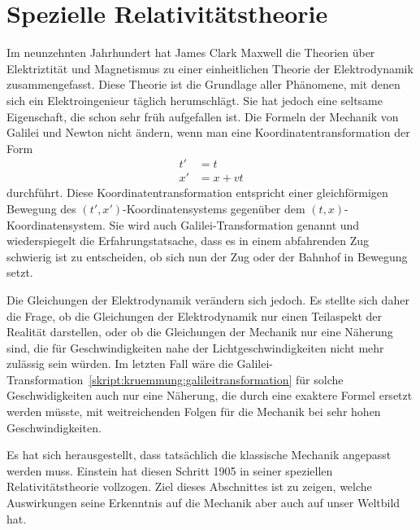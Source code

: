 %
%
%

\chapter{Spezielle Relativitätstheorie%
\label{skript:chapter:spezielle}}
\rhead{}
Im neunzehnten Jahrhundert hat James Clark Maxwell die Theorien
über Elektriztität und Magnetismus zu einer einheitlichen Theorie
der Elektrodynamik zusammengefasst.
Diese Theorie ist die Grundlage aller Phänomene, mit denen sich
ein Elektroingenieur täglich herumschlägt.
Sie hat jedoch eine seltsame Eigenschaft, die schon sehr früh
aufgefallen ist.
Die Formeln der Mechanik von Galilei und Newton nicht ändern,
wenn man eine Koordinatentransformation der Form
\begin{equation}
\begin{aligned}
t'&=t\\
x'&=x+vt
\end{aligned}
\label{skript:kruemmung:galileitransformation}
\end{equation}
durchführt.
Diese Koordinatentransformation entspricht einer gleichförmigen
Bewegung des $(t',x')$-Koordinatensystems gegenüber dem 
$(t,x)$-Koordinatensystem.
Sie wird auch Galilei-Transformation genannt und wiederspiegelt die
Erfahrungstatsache, dass es in einem abfahrenden Zug schwierig ist
zu entscheiden, ob sich nun der Zug oder der Bahnhof in Bewegung setzt.

Die Gleichungen der Elektrodynamik verändern sich jedoch.
Es stellte sich daher die Frage, ob die Gleichungen der Elektrodynamik
nur einen Teilaspekt der Realität darstellen, oder ob die Gleichungen
der Mechanik nur eine Näherung sind, die für Geschwindigkeiten nahe
der Lichtgeschwindigkeiten nicht mehr zulässig sein würden.
Im letzten Fall wäre die
Galilei-Transformation~\eqref{skript:kruemmung:galileitransformation}
für solche Geschwidigkeiten auch nur eine Näherung, die durch
eine exaktere Formel ersetzt werden müsste, mit weitreichenden
Folgen für die Mechanik bei sehr hohen Geschwindigkeiten.

Es hat sich herausgestellt, dass tatsächlich die klassische Mechanik
angepasst werden muss.
Einstein hat diesen Schritt 1905 in seiner speziellen Relativitätstheorie
vollzogen.
Ziel dieses Abschnittes ist zu zeigen, welche Auswirkungen seine
Erkenntnis auf die Mechanik aber auch auf unser Weltbild hat.

